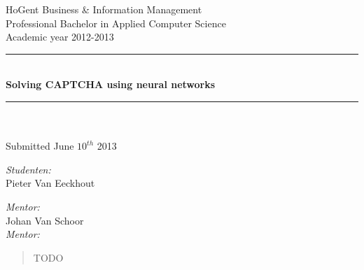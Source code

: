 \documentclass[pdftex,a4paper,12pt,twoside]{report}
\newcommand{\HRule}{\rule{\linewidth}{0.5mm}}
\newcommand{\emptypage}{
\newpage
\thispagestyle{empty}
\mbox{}
\newpage
}
\theoremstyle{plain} \newtheorem{theorem}{Theorem} \newtheorem{proposition}{Proposition} \newtheorem{lemma}{Lemma} \newtheorem*{corollary}{Corollary}
\theoremstyle{definition} \newtheorem{definition}{Definition} \newtheorem{conjecture}{Conjecture} \newtheorem*{example}{Example} \newtheorem{algorithm}{Algorithm}
\theoremstyle{remark} \newtheorem*{remark}{Remark} \newtheorem*{note}{Note} \newtheorem{case}{Case}
\newcommand{\captchasp}{CAPTCHA }
\newcommand{\studenta}{Pieter {Van Eeckhout}}
\newcommand{\begeleider}{Johan {Van Schoor}}
\newcommand{\titel}{Solving \captchasp using neural networks}
\newcommand{\ondertitel}{}
\newcommand{\datum}{June $10^{th}$ 2013}
\newcommand{\academiejaar}{2012-2013}
\begin{document}
\emptypage


\begin{titlepage}
\begin{center}
HoGent Business \& Information Management\\
Professional Bachelor in Applied Computer Science\\
Academic year \academiejaar

\vfill

\HRule \\[0.4cm]
{ \huge \bfseries \titel}\\[0.4cm]
\HRule \\[0.4cm]

{\Large \ondertitel}\\[0.4cm]

Submitted \datum

\vfill

\begin{minipage}{0.49\textwidth}
\begin{flushleft}
\emph{Student\ifdefined\studentb en\fi :}\\
\studenta \\
\ifdefined\studentb \studentb \fi\par
\end{flushleft}
\end{minipage}
\begin{minipage}{0.49\textwidth}
\begin{flushright}
\emph{Mentor:}\\ \begeleider\\
\ifdefined\mentor \emph{Mentor:}\\ \mentor \fi
\end{flushright}
\end{minipage}

\end{center}

\end{titlepage}


\tableofcontents



\begin{abstract}


TODO
\end{abstract}
\end{document}
